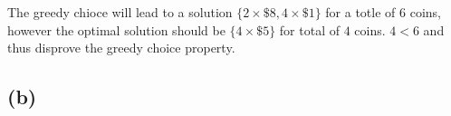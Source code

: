 \documentclass[11pt]{article}
\begin{document}
The greedy chioce will lead to a solution $\{2 \times \$8, 4 \times \$1\}$ for a totle of $6$ coins, however the optimal solution should be $\{4 \times \$5\}$ for total of $4$ coins. $4 < 6$ and thus disprove the greedy choice property.

\subsection{(b)}

%
% 
% 
\end{document}
